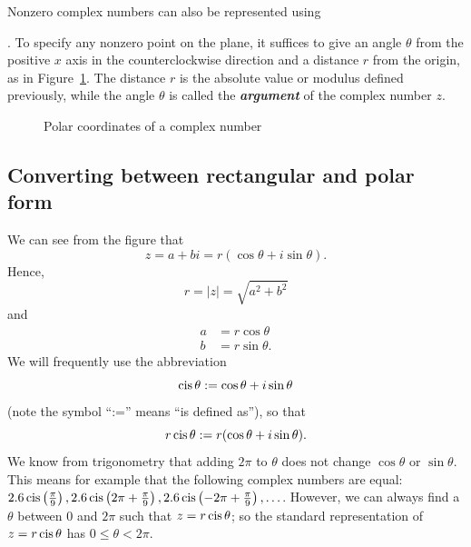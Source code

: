 Nonzero complex numbers can also be represented using {. To specify any nonzero point on the plane, it suffices
to give an angle $\theta$ from the positive $x$ axis in the counterclockwise
direction and a distance $r$ from the origin, as in Figure~\ref{polarcoord}.
The distance  $r$ is the absolute value or modulus defined previously, while the angle $\theta$ is called the {\bf \emph{argument}} of the complex number $z$.
\begin{figure}[htb]
\begin{center}

\end{center}
\caption{Polar coordinates of a complex number}
\label{polarcoord}
\end{figure}


\subsection{Converting between rectangular and polar form}

We can see from the figure that \[
z=a+bi=r(\cos\theta+i\sin\theta).\]
 Hence, \[
r=|z|=\sqrt{a^{2}+b^{2}}\]
 and \begin{align*}
a & =r\cos\theta\\
b & =r\sin\theta.\end{align*}
 We will frequently use the abbreviation
\[ \operatorname{cis}\theta := \cos\theta+i\sin\theta \]
(note the symbol ``:='' means ``is defined as''), so that
\[ r\operatorname{cis}\theta := r(\cos\theta+i\sin\theta).\]
We know from trigonometry that adding $2 \pi$ to $\theta$ does not change $\cos \theta$ or $\sin \theta$. This means for example that the following complex numbers are equal: $2.6 \operatorname{cis}\left(\frac{\pi}{9}\right), 2.6 \operatorname{cis}\left(2\pi + \frac{\pi}{9}\right), 2.6 \operatorname{cis}\left(-2\pi + \frac{\pi}{9}\right), \ldots $.  However, we can always find a $\theta$ between $0$ and $2\pi$ such that $z = r \operatorname{cis} \theta$;  so the standard representation of $z = r \operatorname{cis} \theta$ has $0 \leq \theta < 2\pi$.

}
